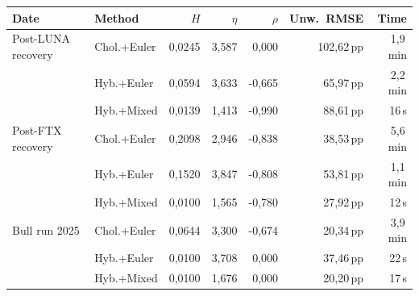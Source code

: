 \begin{tabular}{l l r r r r r}
  \toprule
  \textbf{Date} & \textbf{Method} & \textbf{$H$} & \textbf{$\eta$} & \textbf{$\rho$} & \textbf{Unw.\ RMSE} & \textbf{Time} \\
  \midrule
  Post-LUNA recovery & Chol.+Euler & 0,0245 & 3,587 & 0,000 & 102,62\,pp & 1,9\,min \\
   & Hyb.+Euler & 0,0594 & 3,633 & -0,665 & 65,97\,pp & 2,2\,min \\
   & Hyb.+Mixed & 0,0139 & 1,413 & -0,990 & 88,61\,pp & 16\,s \\
  \addlinespace[3pt]
  Post-FTX recovery & Chol.+Euler & 0,2098 & 2,946 & -0,838 & 38,53\,pp & 5,6\,min \\
   & Hyb.+Euler & 0,1520 & 3,847 & -0,808 & 53,81\,pp & 1,1\,min \\
   & Hyb.+Mixed & 0,0100 & 1,565 & -0,780 & 27,92\,pp & 12\,s \\
  \addlinespace[3pt]
  Bull run 2025 & Chol.+Euler & 0,0644 & 3,300 & -0,674 & 20,34\,pp & 3,9\,min \\
   & Hyb.+Euler & 0,0100 & 3,708 & 0,000 & 37,46\,pp & 22\,s \\
   & Hyb.+Mixed & 0,0100 & 1,676 & 0,000 & 20,20\,pp & 17\,s \\
  \bottomrule
\end{tabular}